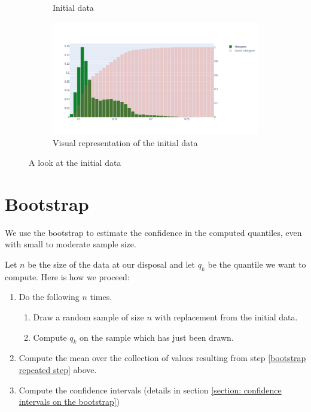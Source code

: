 \documentclass{article}
\begin{document}
\begin{figure}[H]
\begin{subfigure}{.25\textwidth}
        \caption{Initial data}
        \label{fig: initial data}
    \end{subfigure}
    \hfill
    \begin{subfigure}{.74\textwidth}
        \centering
        \includegraphics[width=\textwidth]{images/plot_excel_data.png}
        \caption{Visual representation of the initial data}
        \label{fig: visual representation of the initial data}
    \end{subfigure}
    \caption{A look at the initial data}
\end{figure}

\section{Bootstrap}
\label{section: bootstrap}
We use the bootstrap to estimate the confidence in the computed quantiles, even with small to moderate sample size.

Let \(n\) be the size of the data at our disposal and let \(q_k\) be the quantile we want to compute. Here is how we proceed:
\begin{enumerate}
    \item Do the following \(n\) times.
          \begin{enumerate}
              \item Draw a random sample of size \(n\) with replacement from the initial data.
              \item Compute \(q_k\) on the sample which has just been drawn. \label{bootstrap repeated step}
          \end{enumerate}
    \item Compute the mean over the collection of values resulting from step \ref{bootstrap repeated step} above.
    \item Compute the confidence intervals (details in section \ref{section: confidence intervals on the bootstrap})
\end{enumerate}
\end{document}
